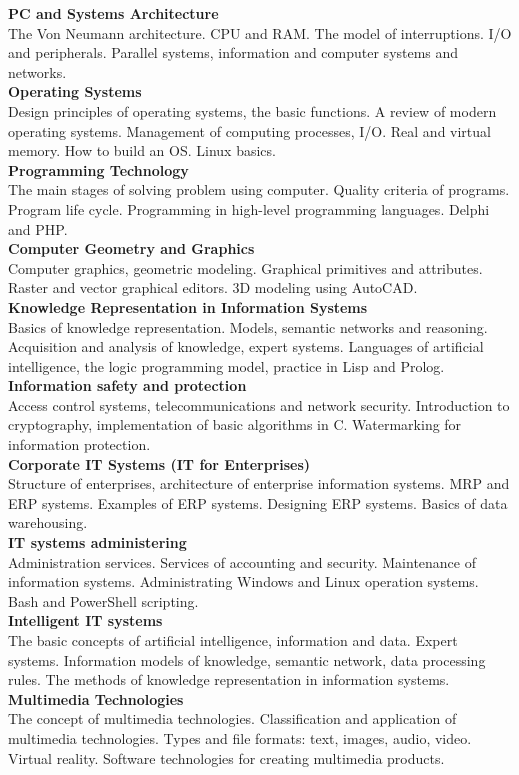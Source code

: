 \documentclass[a4paper, 12pt]{article}
\newcommand{\discipline}[1] {\textbf{#1} \\ }
\newcommand{\desc}[1] { #1 \\ }
\begin{document}
\discipline{PC and Systems Architecture}
\desc{The Von Neumann architecture. CPU and RAM. The model of interruptions. I/O and peripherals. Parallel systems, information and computer systems and networks.}

\discipline{Operating Systems}
\desc{Design principles of operating systems, the basic functions. A review of modern operating systems. Management of computing processes, I/O. Real and virtual memory. How to build an OS. Linux basics.}

\discipline{Programming Technology}
\desc{The main stages of solving problem using computer. Quality criteria of programs. Program life cycle. Programming in high-level programming languages. Delphi and PHP.}

\discipline{Computer Geometry and Graphics}
\desc{Computer graphics, geometric modeling. Graphical primitives and attributes. Raster and vector graphical editors. 3D modeling using AutoCAD.}

\discipline{Knowledge Representation in Information Systems}
\desc{Basics of knowledge representation. Models, semantic networks and reasoning. Acquisition and analysis of knowledge, expert systems. Languages of artificial intelligence, the logic programming model, practice in Lisp and Prolog.}

\discipline{Information safety and protection}
\desc{Access control systems, telecommunications and network security. Introduction to cryptography, implementation of basic algorithms in C. Watermarking for information protection.}

\discipline{Corporate IT Systems (IT for Enterprises)}
\desc{Structure of enterprises, architecture of enterprise information systems. MRP and ERP systems. Examples of ERP systems. Designing ERP systems. Basics of data warehousing.}

\discipline{IT systems administering}
\desc{Administration services. Services of accounting and security. Maintenance of information systems. Administrating Windows and Linux operation systems. Bash and PowerShell scripting.}

\discipline{Intelligent IT systems}
\desc{The basic concepts of artificial intelligence, information and data. Expert systems. Information models of knowledge, semantic network, data processing rules. The methods of knowledge representation in information systems.}

\discipline{Multimedia Technologies}
\desc{The concept of multimedia technologies. Classification and application of multimedia technologies. Types and file formats: text, images, audio, video. Virtual reality. Software technologies for creating multimedia products.}
\end{document}
